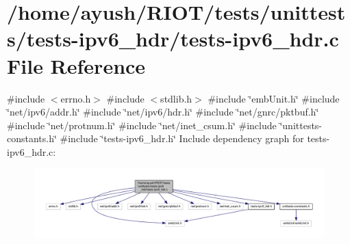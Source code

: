\hypertarget{tests-ipv6__hdr_8c}{}\section{/home/ayush/\+R\+I\+O\+T/tests/unittests/tests-\/ipv6\+\_\+hdr/tests-\/ipv6\+\_\+hdr.c File Reference}
\label{tests-ipv6__hdr_8c}
{\ttfamily \#include $<$errno.\+h$>$}\newline
{\ttfamily \#include $<$stdlib.\+h$>$}\newline
{\ttfamily \#include \char`\"{}emb\+Unit.\+h\char`\"{}}\newline
{\ttfamily \#include \char`\"{}net/ipv6/addr.\+h\char`\"{}}\newline
{\ttfamily \#include \char`\"{}net/ipv6/hdr.\+h\char`\"{}}\newline
{\ttfamily \#include \char`\"{}net/gnrc/pktbuf.\+h\char`\"{}}\newline
{\ttfamily \#include \char`\"{}net/protnum.\+h\char`\"{}}\newline
{\ttfamily \#include \char`\"{}net/inet\+\_\+csum.\+h\char`\"{}}\newline
{\ttfamily \#include \char`\"{}unittests-\/constants.\+h\char`\"{}}\newline
{\ttfamily \#include \char`\"{}tests-\/ipv6\+\_\+hdr.\+h\char`\"{}}\newline
Include dependency graph for tests-\/ipv6\+\_\+hdr.c\+:
\nopagebreak
\begin{figure}[H]
\begin{center}
\leavevmode
\includegraphics[width=350pt]{tests-ipv6__hdr_8c__incl}
\end{center}
\end{figure}
